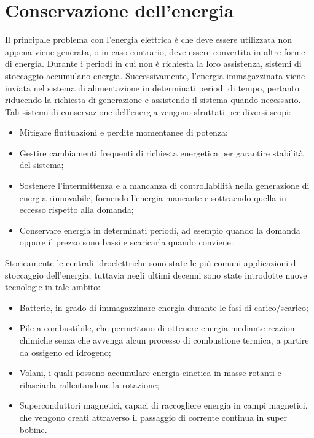 \section{Conservazione dell'energia}
Il principale problema con l'energia elettrica è che deve essere utilizzata non appena viene generata, o in caso contrario, deve essere convertita in altre forme di energia. Durante i periodi in cui non è richiesta la loro assistenza, sistemi di stoccaggio accumulano energia. Successivamente, l'energia immagazzinata viene inviata nel sistema di alimentazione in determinati periodi di tempo, pertanto
riducendo la richiesta di generazione e assistendo il sistema quando necessario. 
Tali sistemi di conservazione dell'energia vengono sfruttati per diversi scopi:
\begin{itemize}
	\item Mitigare fluttuazioni e perdite momentanee di potenza;
	\item Gestire cambiamenti frequenti di richiesta energetica per garantire stabilità del sistema; 
	\item Sostenere l'intermittenza e a mancanza di controllabilità nella generazione di energia rinnovabile, fornendo l'energia mancante e sottraendo quella in eccesso rispetto alla domanda;
	\item Conservare energia in determinati periodi, ad esempio quando la domanda oppure il prezzo sono bassi e scaricarla quando conviene.
\end{itemize}

Storicamente le centrali idroelettriche sono state le più comuni applicazioni di stoccaggio dell'energia, tuttavia negli ultimi decenni sono state introdotte nuove tecnologie in tale ambito:
\begin{itemize}
	\item Batterie, in grado di immagazzinare energia durante le fasi di carico/scarico;
	\item Pile a combustibile, che permettono di ottenere energia mediante reazioni chimiche senza che avvenga alcun processo di combustione termica, a partire da ossigeno ed idrogeno;
	\item Volani, i quali possono accumulare energia cinetica in masse rotanti e rilasciarla rallentandone la rotazione;
	\item Superconduttori magnetici, capaci  di raccogliere energia in campi magnetici, che vengono creati attraverso il passaggio di corrente continua in super bobine.  
\end{itemize}

